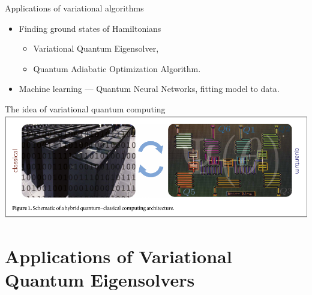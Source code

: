 \begingroup
\begin{frame}{}
    \begin{block}{Applications of variational algorithms}
    \begin{itemize}
        \item Finding ground states of Hamiltonians 
        \begin{itemize}
            \item Variational Quantum Eigensolver,
            \item Quantum Adiabatic Optimization Algorithm.
        \end{itemize}
        \item Machine learning — Quantum Neural Networks, fitting model to data.
    \end{itemize}
    \end{block}
\end{frame}
\endgroup
\begin{frame}{The idea of variational quantum computing}
    \centering
    \includegraphics[page=1, width=\textwidth]{pics/vqe.pdf}
\end{frame}
\section{Applications of Variational Quantum Eigensolvers}
